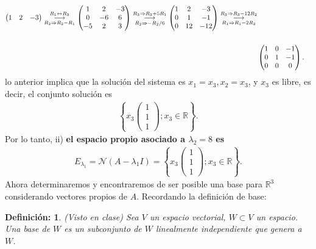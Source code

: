 \documentclass[11pt,letterpaper]{article}
\newcommand{\mR}{\mathbb{R}}
\newcommand{\mcN}{\mathcal{N}}
\newcommand{\grstep}[2][\relax]{%
   \ensuremath{\mathrel{
       {\mathop{\longrightarrow}\limits^{#2\mathstrut}_{
                                     \begin{subarray}{l} #1 \end{subarray}}}}}}
\newtheorem{thmd}{Definición:}
\begin{document}
\begin{enumerate}
\begin{align*}
\begin{pmatrix}
1 & 2 & -3
\end{pmatrix}%
\grstep[R_2\Rightarrow R_2-R_1]{R_1 \leftrightarrow R_3}
%
\begin{pmatrix}
1 & 2 & -3\\
0 & -6 & 6\\
-5 & 2 & 3\\
\end{pmatrix}%
\grstep[R_2\Rightarrow -R_2/6]{R_3 \Rightarrow R_3+5R_1}
%
\begin{pmatrix}
1 & 2 & -3\\
0 & 1 & -1\\
0 & 12 & -12\\
\end{pmatrix}%
\grstep[R_1\Rightarrow R_1-2R_2]{R_3 \Rightarrow R_3-12R_2}
\\ \\
&\begin{pmatrix}
1 & 0 & -1\\
0 & 1 & -1\\
0 & 0 & 0\\
\end{pmatrix}.
\end{align*}
lo anterior implica que la solución del sistema es $x_1=x_3, x_2=x_3$, y $x_3$ es libre, es decir, el conjunto solución es
\begin{align*}
\left\{x_3\begin{pmatrix}
1\\
1\\
1
\end{pmatrix}; x_3\in \mR \right\}.
\end{align*}
Por lo tanto, ii) \textbf{el espacio propio asociado a $\lambda_2=8$ es}
\begin{align*}
E_{\lambda_1} = \mcN(A-\lambda_1 I) =\left\{x_3\begin{pmatrix}
1\\
1\\
1
\end{pmatrix}; x_3\in \mR \right\}.
\end{align*}
Ahora determinaremos y encontraremos de ser posible una base para $\mR^3$ considerando vectores propios de $A$. Recordando la definición de base:
\begin{framed}
    \begin{thmd} \label{d_base}
	(Visto en clase) Sea $V$ un espacio vectorial, $W\subset V$ un espacio. Una base de $W$ es un subconjunto de $W$ linealmente independiente que genera a $W$. 
    \end{thmd}
\end{framed}


\end{enumerate}
\end{document}

